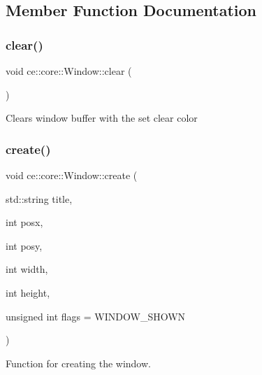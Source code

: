 \subsection{Member Function Documentation}
\mbox{\label{classce_1_1core_1_1_window_ab47b3b317acbf0ba71f4e56bd2313f0d}} 
\subsubsection{\texorpdfstring{clear()}{clear()}}
{\footnotesize\ttfamily void ce\+::core\+::\+Window\+::clear (\begin{DoxyParamCaption}{ }\end{DoxyParamCaption})}

Clears window buffer with the set clear color \mbox{\label{classce_1_1core_1_1_window_a4bdfb3cf6986e6144546cdfeb4c19e6e}} 
\subsubsection{\texorpdfstring{create()}{create()}}
{\footnotesize\ttfamily void ce\+::core\+::\+Window\+::create (\begin{DoxyParamCaption}\item[{std\+::string}]{title,  }\item[{int}]{posx,  }\item[{int}]{posy,  }\item[{int}]{width,  }\item[{int}]{height,  }\item[{unsigned int}]{flags = {\ttfamily WINDOW\+\_\+SHOWN} }\end{DoxyParamCaption})}



Function for creating the window. 


